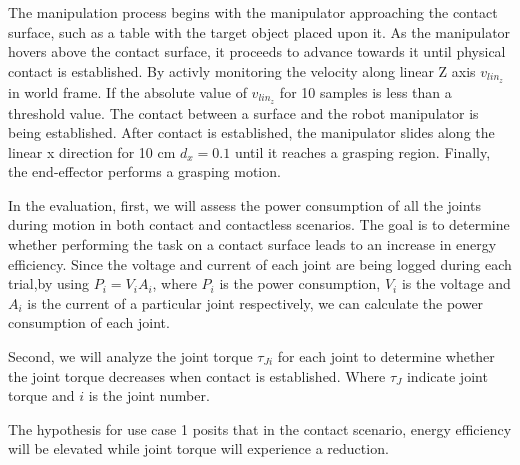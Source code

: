 \documentclass[report.tex]{subfiles}
\begin{document}
    The manipulation process begins with the manipulator approaching the contact surface, such as a table with the target object placed upon it. As the manipulator hovers above the contact surface, it proceeds to advance towards it until physical contact is established. By activly monitoring the velocity along linear Z axis $v_{lin_z}$in world frame. If the absolute value of $v_{lin_z}$ for 10 samples is less than a threshold value. The contact between a surface and the robot manipulator is being established.
    After contact is established, the manipulator slides along the linear x direction for 10 cm $d_{x} = 0.1$ until it reaches a grasping region. Finally, the end-effector performs a grasping motion.
    
    In the evaluation, first, we will assess the power consumption of all the joints during motion in both contact and contactless scenarios. The goal is to determine whether performing the task on a contact surface leads to an increase in energy efficiency. Since the voltage and current of each joint are being logged during each trial,by using $P_i = V_i A_i$, where $P_i$ is the power consumption, $V_i$ is the voltage and $A_i$ is the current of a particular joint respectively, we can calculate the power consumption of each joint.

    Second, we will analyze the joint torque $\tau_{Ji}$ for each joint to determine whether the joint torque decreases when contact is established. Where $\tau_J$ indicate joint torque and $i$ is the joint number.

    The hypothesis for use case 1 posits that in the contact scenario, energy efficiency will be elevated while joint torque will experience a reduction.
\end{document}
